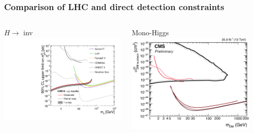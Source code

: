 \documentclass[aspectratio=169,xcolor=dvipsnames,,table,compress]{beamer}
\begin{document}
\begin{frame} \frametitle{Comparison of LHC and direct detection constraints}
  \begin{columns}[T]
    \begin{column}{0.33\textwidth}
      \centering
      $H\rightarrow$ inv \\
      \includegraphics[width=\textwidth]{../figures/vbf/fits/dd.pdf}
    \end{column}
    \begin{column}{0.33\textwidth}
      \centering
      Mono-Higgs\\
      \includegraphics[width=\textwidth]{../figures/talk/monohiggs.png}
    \end{column}
    \begin{column}{0.33\textwidth}

\end{column}
\end{columns}
\end{frame}
\end{document}
